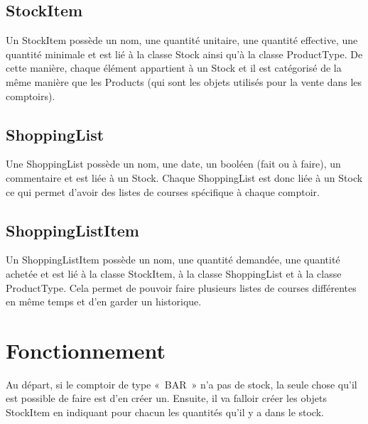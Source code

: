 \documentclass[a4paper]{report}
\begin{document}
\subsection{StockItem}
\par Un StockItem possède un nom, une quantité unitaire, une quantité effective, une quantité minimale et est lié à la
classe Stock ainsi qu’à la classe ProductType. De cette manière, chaque élément appartient à un Stock et il est
catégorisé de la même manière que les Products (qui sont les objets utilisés pour la vente dans les comptoirs).

\subsection{ShoppingList}
\par Une ShoppingList possède un nom, une date, un booléen (fait ou à faire), un commentaire et est liée à un Stock.
Chaque ShoppingList est donc liée à un Stock ce qui permet d’avoir des listes de courses spécifique à chaque comptoir.

\subsection{ShoppingListItem}
\par Un ShoppingListItem possède un nom, une quantité demandée, une quantité achetée et est lié à la classe StockItem, à
la classe ShoppingList et à la classe ProductType. Cela permet de pouvoir faire plusieurs listes de courses différentes
en même temps et d’en garder un historique.

\section{Fonctionnement}
\label{sec:fonctionnement}

\par Au départ, si le comptoir de type « BAR » n’a pas de stock, la seule chose qu’il est possible de faire est d’en
créer un. Ensuite, il va falloir créer les objets StockItem en indiquant pour chacun les quantités qu’il y a dans le
stock.
\end{document}

